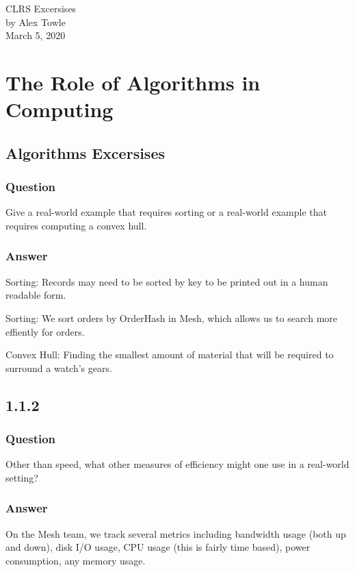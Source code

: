 \documentclass{article}
\begin{document}
    \begin{titlepage}
        \vspace*{250pt}
        \begin{center}
            {\Huge{CLRS Excersises}}\\[10pt]
            {\Large{by Alex Towle}}\\[8pt]
            {\Large{March 5, 2020}}
        \end{center}
        \vfill
    \end{titlepage}
    \section{The Role of Algorithms in Computing}
        \subsection{Algorithms Excersises}
            \subsubsection{Question} 
                Give a real-world example that requires sorting or a real-world example that requires computing a convex hull.

            \subsubsection{Answer}
                Sorting: Records may need to be sorted by key to be printed out in a human readable form.

                Sorting: We sort orders by OrderHash in Mesh, which allows us to search more effiently for orders.

                Convex Hull: Finding the smallest amount of material that will be required to surround a watch's gears.

        \subsection{1.1.2}
            \subsubsection{Question}
                Other than speed, what other measures of efficiency might one use in a real-world setting?

            \subsubsection{Answer}
                On the Mesh team, we track several metrics including bandwidth usage (both up and down), disk I/O usage,
                CPU usage (this is fairly time based), power consumption, any memory usage.
\end{document}
